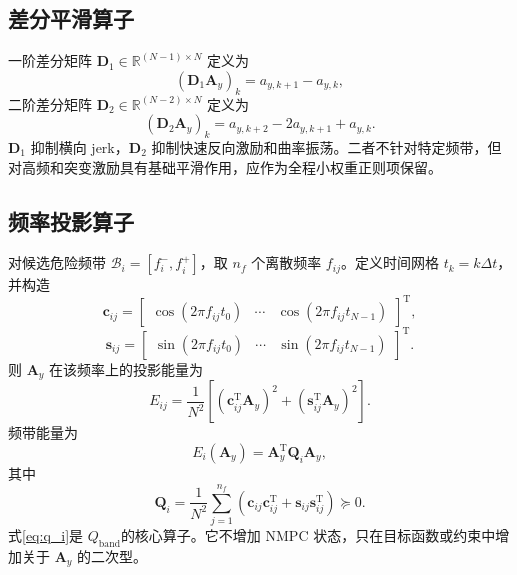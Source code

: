 \documentclass[UTF8,zihao=-4]{ctexrep}
\newcommand{\Qband}{$Q_{\mathrm{band}}$}
\newcommand{\T}{\mathrm{T}}
\newcommand{\R}{\mathbb{R}}
\begin{document}
\subsection{差分平滑算子}
一阶差分矩阵 $\bm D_1\in\R^{(N-1)\times N}$ 定义为
\begin{equation}
    (\bm D_1\bm A_y)_k=a_{y,k+1}-a_{y,k},
\end{equation}
二阶差分矩阵 $\bm D_2\in\R^{(N-2)\times N}$ 定义为
\begin{equation}
    (\bm D_2\bm A_y)_k=a_{y,k+2}-2a_{y,k+1}+a_{y,k}.
\end{equation}
$\bm D_1$ 抑制横向 jerk，$\bm D_2$ 抑制快速反向激励和曲率振荡。二者不针对特定频带，但对高频和突变激励具有基础平滑作用，应作为全程小权重正则项保留。

\subsection{频率投影算子}
对候选危险频带 $\mathcal B_i=[f_i^-,f_i^+]$，取 $n_f$ 个离散频率 $f_{ij}$。定义时间网格 $t_k=k\Delta t$，并构造
\begin{equation}
    \bm c_{ij}=\begin{bmatrix}\cos(2\pi f_{ij}t_0)&\cdots&\cos(2\pi f_{ij}t_{N-1})\end{bmatrix}^{\T},
\end{equation}
\begin{equation}
    \bm s_{ij}=\begin{bmatrix}\sin(2\pi f_{ij}t_0)&\cdots&\sin(2\pi f_{ij}t_{N-1})\end{bmatrix}^{\T}.
\end{equation}
则 $\bm A_y$ 在该频率上的投影能量为
\begin{equation}
    E_{ij}=\frac{1}{N^2}\left[(\bm c_{ij}^{\T}\bm A_y)^2+(\bm s_{ij}^{\T}\bm A_y)^2\right].
\end{equation}
频带能量为
\begin{equation}
    E_i(\bm A_y)=\bm A_y^{\T}\bm Q_i\bm A_y,
    \label{eq:band_energy}
\end{equation}
其中
\begin{equation}
    \bm Q_i=\frac{1}{N^2}\sum_{j=1}^{n_f}\left(\bm c_{ij}\bm c_{ij}^{\T}+\bm s_{ij}\bm s_{ij}^{\T}\right)\succeq 0 .
    \label{eq:q_i}
\end{equation}
式\eqref{eq:q_i}是 \Qband 的核心算子。它不增加 NMPC 状态，只在目标函数或约束中增加关于 $\bm A_y$ 的二次型。
\end{document}
